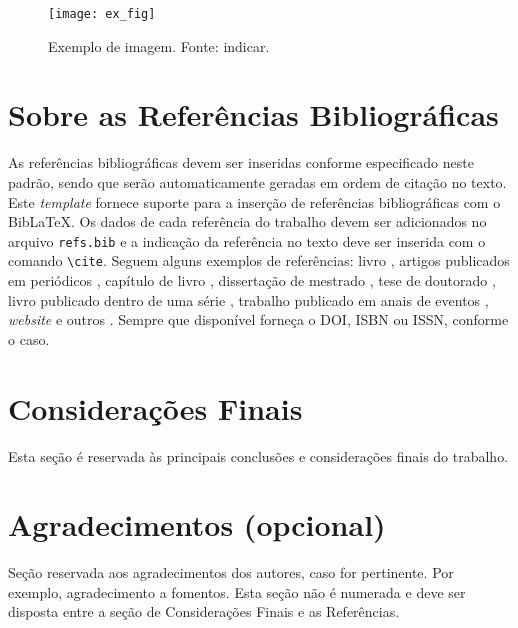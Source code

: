 \documentclass{pssbmac}
\begin{document}
\begin{figure}[H]
\centering
\texttt{[image: ex\_fig]}
\caption{ {\small Exemplo de imagem. Fonte: indicar.}}
\label{figura01}
\end{figure}

\section{Sobre as Referências Bibliográficas}

As referências bibliográficas devem ser inseridas conforme especificado neste padrão, sendo que serão automaticamente geradas em ordem de citação no texto. Este {\it template} fornece suporte para a inserção de referências bibliográficas com o Bib\LaTeX{}. Os dados de cada referência do trabalho devem ser adicionados no arquivo \verb+refs.bib+ e a indicação da referência no texto deve ser inserida com o comando \verb+\cite+. Seguem alguns exemplos de referências: livro \cite{Boldrini}, artigos publicados em periódicos \cite{Contiero,Cuminato}, capítulo de livro \cite{daSilva}, dissertação de mestrado \cite{Diniz}, tese de doutorado \cite{Mallet}, livro publicado dentro de uma série \cite{Gomes}, trabalho publicado em anais de eventos \cite{Santos}, {\it website} e outros \cite{CNMAC}. Sempre que disponível forneça o DOI, ISBN ou ISSN, conforme o caso.

\section{Considerações Finais}

Esta seção é reservada às principais conclusões e considerações finais do trabalho.

\section*{Agradecimentos (opcional)}

Seção reservada aos agradecimentos dos autores, caso for pertinente. Por exemplo, agradecimento a fomentos. Esta seção não é numerada e deve ser disposta entre a seção de Considerações Finais e as Referências.


\printbibliography
\end{document}
